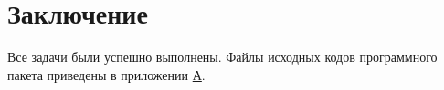 \documentclass[../main]{subfiles}
\begin{document}
\newpage
{}
{}
\section*{Заключение}

Все задачи были успешно выполнены. Файлы исходных кодов программного пакета приведены в приложении \hyperref[sec:appendix1]{А}.
\end{document}
